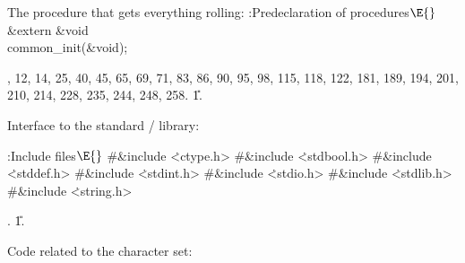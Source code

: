 The procedure that gets everything rolling:
\Y\B\4:Predeclaration of procedures\X${}\E{}$\6
\&{extern} \&{void} \\{common\_init}(\&{void});\par
{}, 12, 14, 25, 40, 45, 65, 69, 71, 83, 86, 90, 95, 98, 115, 118, 122, 181,
189, 194, 201, 210, 214, 228, 235, 244, 248, 258.
\U1.\fi

Interface to the standard \CEE/ library:

\Y\B\4:Include files\X${}\E{}$\6
\8\#\&{include} \.{<ctype.h>}\6
\8\#\&{include} \.{<stdbool.h>}\6
\8\#\&{include} \.{<stddef.h>}\6
\8\#\&{include} \.{<stdint.h>}\6
\8\#\&{include} \.{<stdio.h>}\6
\8\#\&{include} \.{<stdlib.h>}\6
\8\#\&{include} \.{<string.h>}\par
{}.
\U1.\fi

Code related to the character set:

